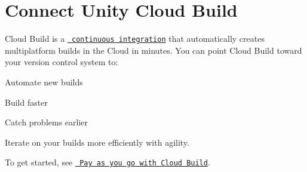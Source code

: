 \chapter{Connect Unity Cloud Build}
\hypertarget{md__hey_tea_9_2_library_2_package_cache_2com_8unity_8collab-proxy_0d2_80_85_2_documentation_0i_2_reconnect_c_b}{}\label{md__hey_tea_9_2_library_2_package_cache_2com_8unity_8collab-proxy_0d2_80_85_2_documentation_0i_2_reconnect_c_b}
\label{md__hey_tea_9_2_library_2_package_cache_2com_8unity_8collab-proxy_0d2_80_85_2_documentation_0i_2_reconnect_c_b_autotoc_md890}%
%
  Cloud Build is a \href{https://docs.unity3d.com/2022.2/Documentation/Manual/UnityCloudBuild.html\#automated-build-generation}{\texttt{ continuous integration}} that automatically creates multiplatform builds in the Cloud in minutes. You can point Cloud Build toward your version control system to\+:


\begin{DoxyItemize}
\item Automate new builds
\item Build faster
\item Catch problems earlier
\item Iterate on your builds more efficiently with agility.
\end{DoxyItemize}

To get started, see \href{https://docs.unity3d.com/2022.2/Documentation/Manual/UnityCloudBuildMeteredBilling.html}{\texttt{ Pay as you go with Cloud Build}}. 